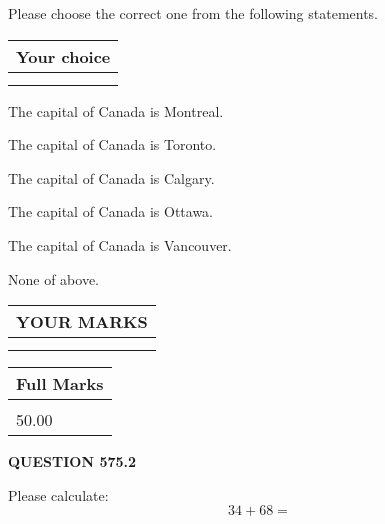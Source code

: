 \documentclass[12pt]{article}
\begin{document}
  
Please choose the correct one from the following statements.
  
  
\noindent\hspace{3.0in} \begin{tabular}{|l|}
\hline
Your choice \\
\hline
 \\ 
 \\ 
\hline
\end{tabular}
  
  
 
 
The capital of Canada is Montreal.
 
 
The capital of Canada is Toronto.
 
 
The capital of Canada is Calgary.
 
 
The capital of Canada is Ottawa.
 
 
The capital of Canada is Vancouver.
 
 
 None of above.
 
 
  
\vspace{0.2in}
  
\noindent\begin{tabular}{|l|}
\hline
 YOUR MARKS  \\
\hline
 \\ 
 \\ 
\hline
\end{tabular}
\hspace{0.05in} \begin{tabular}{|l|}
\hline
 Full Marks  \\
\hline
 \\ 
50.00 \\
\hline
\end{tabular}
{\textbf{\Large{QUESTION
575.2 
}}}
  
  
 
Please calculate:
\begin{equation}
34 +  %
68 = \nonumber
\end{equation}
 

 

 
   
   
 \vspace{0.2in}
 
   
   
   
   
\end{document}
